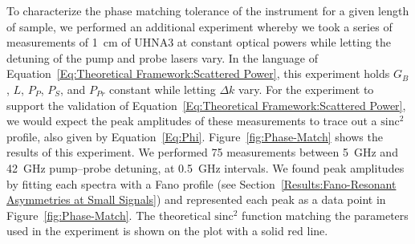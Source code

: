 To characterize the phase matching tolerance of the instrument for a given length of sample, we performed an additional experiment whereby we took a series of measurements of \SI{1}{\centi\meter} of UHNA3 at constant optical powers while letting the detuning of the pump and probe lasers vary. In the language of Equation~\ref{Eq:Theoretical Framework:Scattered Power}, this experiment holds \(G_B\), \(L\), \(P_P\), \(P_S\), and \(P_{Pr}\) constant while letting \(\Delta k\) vary. For the experiment to support the validation of Equation~\ref{Eq:Theoretical Framework:Scattered Power}, we would expect the peak amplitudes of these measurements to trace out a \(\mathrm{sinc^2}\) profile, also given by Equation~\ref{Eq:Phi}. Figure~\ref{fig:Phase-Match} shows the results of this experiment. We performed 75 measurements between \SI{5}{\giga\hertz} and \SI{42}{\giga\hertz} pump--probe detuning, at \SI{0.5}{\giga\hertz} intervals. We found peak amplitudes by fitting each spectra with a Fano profile (see Section~\ref{Results:Fano-Resonant Asymmetries at Small Signals}) and represented each peak as a data point in Figure~\ref{fig:Phase-Match}. The theoretical \(\mathrm{sinc^2}\) function matching the parameters used in the experiment is shown on the plot with a solid red line.


